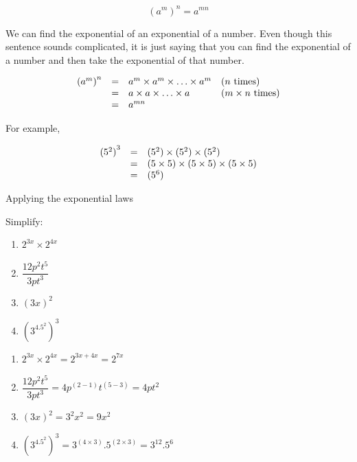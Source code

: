 {
$$ {({a}^{m})}^{n}={a}^{mn} $$

We can find the exponential of an exponential of a number. Even though this sentence sounds complicated, it is just saying that you can find the exponential of a number and then take the exponential of that number. \par


\begin{equation*}
    \begin{array}{ccll}\hfill {({a}^{m})}^{n}& =& {a}^{m}  \times {a}^{m}  \times \ldots  \times {a}^{m}\hfill & (\mbox{$n$ times})\hfill \\
	\hfill & =& a  \times a  \times \ldots  \times a\hfill & ({m}  \times \mbox{$n$ times})\hfill \\
	\hfill & =& {a}^{mn}\hfill & 
    \end{array}
\end{equation*}

}
For example,

\begin{equation*}
    \begin{array}{ccl}\hfill {({5}^{2})}^{3}& =& ({5}^{2})  \times ({5}^{2})  \times ({5}^{2})\hfill \\ 
	      & =& (5  \times 5)  \times (5  \times 5)  \times (5  \times 5)\hfill \\
	      & =& ({5}^{6})\hfill
    \end{array}
\end{equation*}



\begin{wex}
{ %
Applying the exponential laws
}
{%
Simplify:

\begin{enumerate}[itemsep=6pt, label=\textbf{\arabic*}.]
\item  $2^{3x} \times 2^{4x}$
 \item $\dfrac{12p^2t^5}{3pt^3}$
 \item $ (3x)^2 $
 \item $(3^4.5^2)^3$\\
\end{enumerate}

}
{%

\begin{enumerate}[itemsep=6pt, label=\textbf{\arabic*}.]
\item  $2^{3x} \times 2^{4x} = 2^{3x+4x} = 2^{7x}$
 \item $\dfrac{12p^2t^5}{3pt^3} = 4p^{(2-1)}t^{(5-3)} = 4pt^2$
 \item $ (3x)^2 = 3^2x^2 = 9x^2$
 \item $(3^4.5^2)^3 = 3^{(4\times3)}.5^{(2\times3)} = 3^{12}.5^6  $
\end{enumerate}

}


\end{wex}


